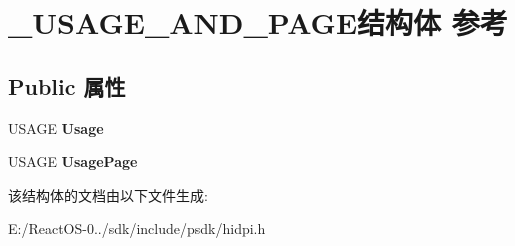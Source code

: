 \hypertarget{struct___u_s_a_g_e___a_n_d___p_a_g_e}{}\section{\+\_\+\+U\+S\+A\+G\+E\+\_\+\+A\+N\+D\+\_\+\+P\+A\+G\+E结构体 参考}
\label{struct___u_s_a_g_e___a_n_d___p_a_g_e}
\subsection*{Public 属性}
\begin{DoxyCompactItemize}
\item 
\mbox{\label{struct___u_s_a_g_e___a_n_d___p_a_g_e_aaca2e0128fd3191c2e898a4c0865c85d}} 
U\+S\+A\+GE {\bfseries Usage}
\item 
\mbox{\label{struct___u_s_a_g_e___a_n_d___p_a_g_e_a2c3fd33f4aef174fe88815dfd9b420f5}} 
U\+S\+A\+GE {\bfseries Usage\+Page}
\end{DoxyCompactItemize}


该结构体的文档由以下文件生成\+:\begin{DoxyCompactItemize}
\item 
E\+:/\+React\+O\+S-\/0../sdk/include/psdk/hidpi.\+h\end{DoxyCompactItemize}
